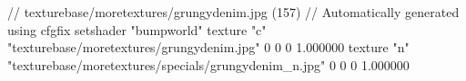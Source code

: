 // texturebase/moretextures/grungydenim.jpg (157)
// Automatically generated using cfgfix
setshader "bumpworld"
texture "c" "texturebase/moretextures/grungydenim.jpg" 0 0 0 1.000000
texture "n" "texturebase/moretextures/specials/grungydenim_n.jpg" 0 0 0 1.000000
